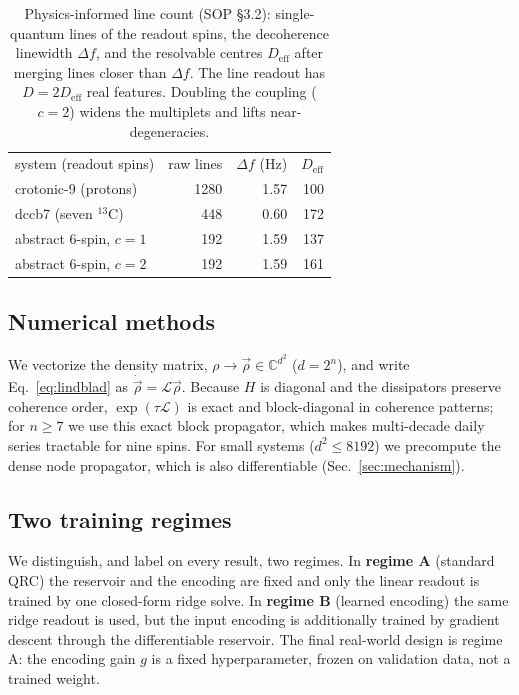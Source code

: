 \documentclass[aps,prresearch,preprint,superscriptaddress,amsmath,amssymb,floatfix]{revtex4-2}
\begin{document}
\begin{table}[t]
\caption{\label{tab:deff}Physics-informed line count (SOP \S3.2): single-quantum lines
of the readout spins, the decoherence linewidth $\Delta f$, and the resolvable centres
$D_{\mathrm{eff}}$ after merging lines closer than $\Delta f$. The line readout has
$D=2D_{\mathrm{eff}}$ real features. Doubling the coupling ($c=2$) widens the multiplets
and lifts near-degeneracies.}
\begin{ruledtabular}
\begin{tabular}{lrrr}
system (readout spins) & raw lines & $\Delta f$ (Hz) & $D_{\mathrm{eff}}$ \\ \colrule
crotonic-9 (protons) & 1280 & 1.57 & 100 \\
dccb7 (seven $^{13}$C) & 448 & 0.60 & 172 \\
abstract 6-spin, $c{=}1$ & 192 & 1.59 & 137 \\
abstract 6-spin, $c{=}2$ & 192 & 1.59 & 161 \\
\end{tabular}
\end{ruledtabular}
\end{table}

\subsection{Numerical methods}
We vectorize the density matrix, $\rho\!\to\!\vec\rho\in\mathbb{C}^{d^2}$ ($d=2^n$), and
write Eq.~\eqref{eq:lindblad} as $\dot{\vec\rho}=\mathcal L\vec\rho$. Because $H$ is
diagonal and the dissipators preserve coherence order, $\exp(\tau\mathcal L)$ is exact
and block-diagonal in coherence patterns; for $n\ge7$ we use this exact block
propagator, which makes multi-decade daily series tractable for nine spins. For small systems ($d^2\le 8192$) we precompute the dense node
propagator, which is also differentiable (Sec.~\ref{sec:mechanism}).

\subsection{Two training regimes}\label{sec:regimes}
We distinguish, and label on every result, two regimes. In \textbf{regime A} (standard
QRC) the reservoir and the encoding are fixed and only the linear readout is
trained by one closed-form ridge solve. In \textbf{regime B} (learned encoding) the
same ridge readout is used, but the input encoding is additionally trained by
gradient descent through the differentiable reservoir. The final real-world design is
regime A: the encoding gain $g$ is a fixed hyperparameter, frozen on validation data,
not a trained weight.
\end{document}
